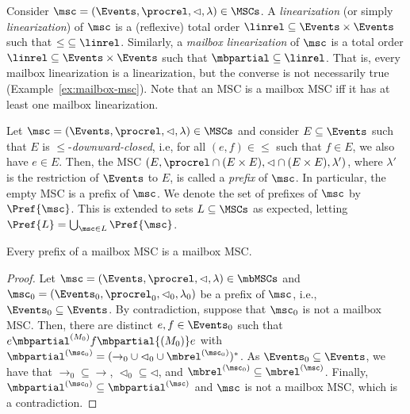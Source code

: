 Consider $\msc = (\Events,\procrel,\lhd,\lambda) \in \MSCs$.
A \emph{\pp linearization} (or simply \emph{linearization}) of $\msc$ is a (reflexive) total order
${\linrel} \subseteq \Events \times \Events$ such that ${\le} \subseteq
{\linrel}$. Similarly,
a \emph{mailbox linearization} of $\msc$ is a total order
${\linrel} \subseteq \Events \times \Events$ such that ${\mbpartial} \subseteq
{\linrel}$. That is, every mailbox linearization is a \pp linearization,
but the converse is not necessarily true (Example~\ref{ex:mailbox-msc}).
Note that an MSC is a mailbox MSC iff it has at least one mailbox linearization.

\medskip

Let $\msc = (\Events,\procrel,\lhd,\lambda) \in \MSCs$ and consider
$E \subseteq \Events$ such that $E$ is ${\le}$-\emph{downward-closed}, i.e,
for all $(e,f) \in {\le}$ such that $f \in E$, we also have $e \in E$.
Then, the MSC $(E,{\procrel} \cap (E \times E),{\lhd} \cap (E \times E),\lambda')$,
where $\lambda'$ is the restriction of $\Events$ to $E$, is called a \emph{prefix}
of $\msc$. In particular, the empty MSC is a prefix of $\msc$.
We denote the set of prefixes of $\msc$ by $\Pref{\msc}$.
This is extended to sets $L \subseteq \MSCs$ as expected, letting
$\Pref{L} = \bigcup_{\msc \in L} \Pref{\msc}$.

\begin{lemma}
\label{lem:mb-prefix}
Every prefix of a mailbox MSC is a mailbox MSC.
\end{lemma}
\begin{proof}
Let $\msc = (\Events, \procrel, \lhd, \lambda) \in \mbMSCs$ and $\msc_0 =
(\Events_0, \procrel_0, \lhd_0, \lambda_0)$ be a prefix of $\msc$, i.e.,
$\Events_0 \subseteq \Events$. By contradiction, suppose that $\msc_0$ is not a
mailbox MSC. Then, there are distinct $e,f \in \Events_0$ such that $e \mbpartial^{(M_0)} f \mbpartial{(M_0)}
e$ with ${\mbpartial^{(\msc_0)}} = ({\rightarrow_0} \cup {\lhd_0} \cup {\mbrel^{(\msc_0)}})^*$.
As $\Events_0 \subseteq \Events$, we have that ${\rightarrow_0} \subseteq {\rightarrow}$, ${\lhd_0} \subseteq {\lhd}$, and ${\mbrel^{(\msc_0)}} \subseteq {\mbrel^{(\msc)}}$. Finally, ${\mbpartial^{(\msc_0)}} \subseteq {\mbpartial^{(\msc)}}$ and $\msc$ is not a mailbox MSC, which is a contradiction.
\end{proof}

